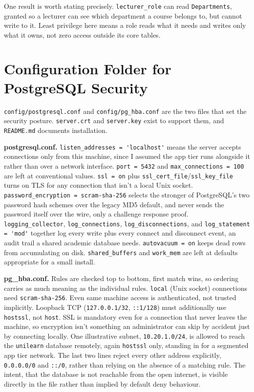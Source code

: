\documentclass[12pt,a4paper]{article}
\begin{document}
One result is worth stating precisely. \lstinline|lecturer_role| can read \lstinline|Departments|, granted so a lecturer can see which department a course belongs to, but cannot write to it. Least privilege here means a role reads what it needs and writes only what it owns, not zero access outside its core tables.

\newpage
\section{Configuration Folder for PostgreSQL Security}
\label{sec:task2}

\lstinline|config/postgresql.conf| and \lstinline|config/pg_hba.conf| are the two files that set the security posture. \lstinline|server.crt| and \lstinline|server.key| exist to support them, and \lstinline|README.md| documents installation.

\noindent\textbf{postgresql.conf.} \lstinline|listen_addresses = 'localhost'| means the server accepts connections only from this machine, since I assumed the app tier runs alongside it rather than over a network interface. \lstinline|port = 5432| and \lstinline|max_connections = 100| are left at conventional values. \lstinline|ssl = on| plus \lstinline|ssl_cert_file|/\lstinline|ssl_key_file| turns on TLS for any connection that isn't a local Unix socket. \lstinline|password_encryption = scram-sha-256| selects the stronger of PostgreSQL's two password hash schemes over the legacy MD5 default, and never sends the password itself over the wire, only a challenge response proof. \lstinline|logging_collector|, \lstinline|log_connections|, \lstinline|log_disconnections|, and \lstinline|log_statement = 'mod'| together log every write plus every connect and disconnect event, an audit trail a shared academic database needs. \lstinline|autovacuum = on| keeps dead rows from accumulating on disk. \lstinline|shared_buffers| and \lstinline|work_mem| are left at defaults appropriate for a small install.

\noindent\textbf{pg\_hba.conf.} Rules are checked top to bottom, first match wins, so ordering carries as much meaning as the individual rules. \lstinline|local| (Unix socket) connections need \lstinline|scram-sha-256|. Even same machine access is authenticated, not trusted implicitly. Loopback TCP (\lstinline|127.0.0.1/32|, \lstinline|::1/128|) must additionally use \lstinline|hostssl|, not \lstinline|host|. SSL is mandatory even for a connection that never leaves the machine, so encryption isn't something an administrator can skip by accident just by connecting locally. One illustrative subnet, \lstinline|10.20.1.0/24|, is allowed to reach the \lstinline|unilearn| database remotely, again \lstinline|hostssl| only, standing in for a segmented app tier network. The last two lines reject every other address explicitly, \lstinline|0.0.0.0/0| and \lstinline|::/0|, rather than relying on the absence of a matching rule. The intent, that the database is not reachable from the open internet, is visible directly in the file rather than implied by default deny behaviour.
\end{document}
